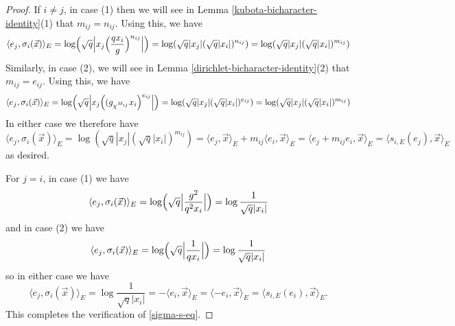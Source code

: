 \documentclass[11pt,letterpaper]{article}
\theoremstyle{definition}
\theoremstyle{remark}
\numberwithin{equation}{section}
\theoremstyle{dotless}
\begin{document}
\begin{proof}
If $i\neq j$, in case (1) then we will see in Lemma \ref{kubota-bicharacter-identity}(1) that $m_{ij} =n_{ij}$.  Using this, we have
\begin{equation*}\langle e_j , \sigma_i(\vec{x} )\rangle_E = \log \Bigl( \sqrt{q} \Bigl| x_j \Bigl(\frac{q x_i}{g}\Bigr)^{n_{ij}}\Bigr| \Bigr) = \log ( \sqrt{q} |x_j| (\sqrt{q} |x_i|)^{n_{ij}}) =  \log ( \sqrt{q} |x_j| (\sqrt{q} |x_i|)^{m_{ij}})  \end{equation*}
Similarly, in case (2), we will see in Lemma \ref{dirichlet-bicharacter-identity}(2) that $m_{ij}=e_{ij}$. Using this, we have
\begin{equation*}\langle e_j , \sigma_i(\vec{x} )\rangle_E = \log \Bigl( \sqrt{q} \Bigl| x_j \Bigl( (g_ {\chi^{M_{ij}}}  x_i \Bigr)^{e_{ij}}\Bigr| \Bigr) = \log ( \sqrt{q} |x_j| (\sqrt{q} |x_i|)^{e_{ij}}) = \log ( \sqrt{q} |x_j| (\sqrt{q} |x_i|)^{m_{ij}})   \end{equation*}
In either case we therefore have
\begin{equation*}\langle e_j , \sigma_i(\vec{x} )\rangle_E =  \log ( \sqrt{q} |x_j| (\sqrt{q} |x_i|)^{m_{ij}})  = \langle e_j, \vec{x} \rangle_E + m_{ij} \langle e_i, \vec{x} \rangle_E= \langle e_j+  m_{ij} e_i, \vec{x} \rangle_E = \langle s_{i,E}(e_j),\vec{x} \rangle_E  \end{equation*} as desired. 

For $j=i$, in case (1) we have \begin{equation*}\langle e_j , \sigma_i(\vec{x} )\rangle_E = \log \Bigl ( \sqrt{q} \Bigl| \frac{ g^2}{ q^2 x_i }\Bigr| \Bigr) = \log \frac{1}{ \sqrt{q} |x_i|} \end{equation*}
and in case (2) we have
\begin{equation*}\langle e_j , \sigma_i(\vec{x} )\rangle_E = \log \Bigl ( \sqrt{q} \Bigl| \frac{ 1}{ q x_i }\Bigr| \Bigr) = \log \frac{1}{ \sqrt{q} |x_i|}\end{equation*}
so in either case we have
\begin{equation*} \langle e_j , \sigma_i(\vec{x} )\rangle_E  = \log \frac{1}{ \sqrt{q} |x_i|}= - \langle e_i, \vec{x} \rangle_E = \langle -e_i, \vec{x}\rangle_E =\langle s_{i,E}(e_i) , \vec{x} \rangle_E. \end{equation*}
This completes the verification of \eqref{sigma-s-eq}.\end{proof}
\end{document}
